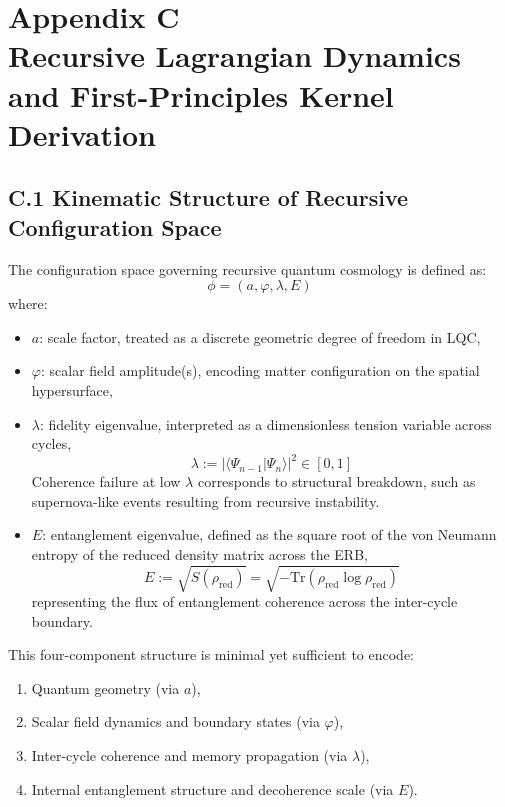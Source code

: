 \section*{Appendix C\\Recursive Lagrangian Dynamics and First-Principles Kernel Derivation}
\label{appendix:C}

\subsection*{C.1 Kinematic Structure of Recursive Configuration Space}

The configuration space governing recursive quantum cosmology is defined as:
\[
\phi = (a, \varphi, \lambda, E)
\]
where:
\begin{itemize}
  \item \( a \): scale factor, treated as a discrete geometric degree of freedom in LQC,
  \item \( \varphi \): scalar field amplitude(s), encoding matter configuration on the spatial hypersurface,
  \item \( \lambda \): fidelity eigenvalue, interpreted as a dimensionless tension variable across cycles,
  \[
  \lambda := |\langle \Psi_{n-1} | \Psi_n \rangle|^2 \in [0,1]
  \]
  Coherence failure at low \( \lambda \) corresponds to structural breakdown, such as supernova-like events resulting from recursive instability.
  \item \( E \): entanglement eigenvalue, defined as the square root of the von Neumann entropy of the reduced density matrix across the ERB,
  \[
  E := \sqrt{S(\rho_{\text{red}})} = \sqrt{-\mathrm{Tr}(\rho_{\text{red}} \log \rho_{\text{red}})}
  \]
  representing the flux of entanglement coherence across the inter-cycle boundary.
\end{itemize}

This four-component structure is minimal yet sufficient to encode:
\begin{enumerate}
    \item Quantum geometry (via \( a \)),
    \item Scalar field dynamics and boundary states (via \( \varphi \)),
    \item Inter-cycle coherence and memory propagation (via \( \lambda \)),
    \item Internal entanglement structure and decoherence scale (via \( E \)).
\end{enumerate}

